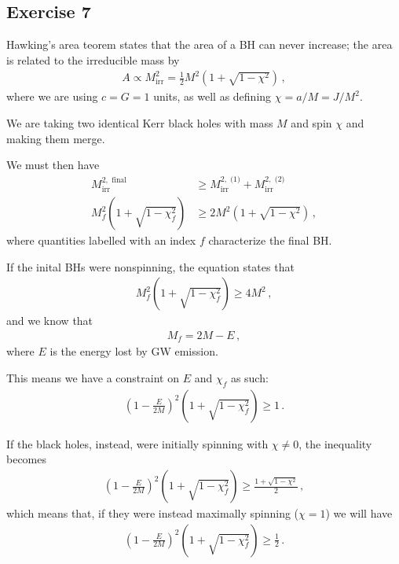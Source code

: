 \documentclass[main.tex]{subfiles}
\begin{document}
\subsection{Exercise 7}

Hawking's area teorem states that the area of a BH can never increase; the area is related to the irreducible mass by 
%
\begin{align}
A \propto M _{\text{irr}}^2 = \frac{1}{2} M^2\left(1 + \sqrt{1 - \chi^2}\right)
\,,
\end{align}
%
where we are using \(c = G = 1\) units, as well as defining \(\chi = a / M = J / M^2\).  

We are taking two identical Kerr black holes with mass \(M\) and spin \(\chi\) and making them merge. 

We must then have %
\begin{align}
M_{\text{irr}}^{2, \text{ final}} &\geq 
M^{2, \text{ (1)}} _{\text{irr}}  +
M^{2, \text{ (2)}} _{\text{irr}}  
\\
M_f^2 \left( 1+ \sqrt{1 - \chi _f^2}\right) &\geq 2 M^2\left(1 + \sqrt{1 - \chi^2}\right)
\,,
\end{align}
%
where quantities labelled with an index \(f\) characterize the final BH. 

If the inital BHs were nonspinning, the equation states that %
\begin{align}
M_f^2 \left(1 + \sqrt{1 - \chi _f^2}\right) \geq 4 M^2
\,,
\end{align}
%
and we know that %
\begin{align}
M_f = 2M - E
\,,
\end{align}
%
where \(E\) is the energy lost by GW emission. 

This means we have a constraint on \(E\) and \(\chi _f\) as such: %
\begin{align}
\left(1 - \frac{E}{2M}\right)^2 \left(1 + \sqrt{1 - \chi _f^2}\right) \geq 1
\,.
\end{align}

If the black holes, instead, were initially spinning with \(\chi \neq 0\), the inequality becomes %
\begin{align}
\left(1 - \frac{E}{2M}\right)^2 \left(1 + \sqrt{1 - \chi _f^2}\right) \geq \frac{1 + \sqrt{1 - \chi^2}}{2}
\,,
\end{align}
%
which means that, if they were instead maximally spinning (\(\chi = 1\)) we will have 
%
\begin{align}
\left(1 - \frac{E}{2M}\right)^2 \left(1 + \sqrt{1 - \chi _f^2}\right) \geq \frac{1}{2}
\,.
\end{align}
\end{document}
